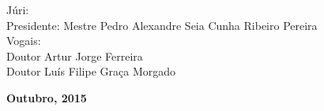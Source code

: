 \begin{titlepage}
\begin{center}
		\begin{tabbing}
		   \fontsize{12pt}{10pt}\selectfont
		   Júri: \\
		   \fontsize{11pt}{10pt}\selectfont
		   \hspace{1.1cm}Presidente: Mestre Pedro Alexandre Seia Cunha Ribeiro Pereira \\
		   \fontsize{11pt}{10pt}\selectfont
		   \hspace{1.1cm}Vogais: \\
		   \fontsize{11pt}{10pt}\selectfont
		   \hspace{2.2cm}Doutor Artur Jorge Ferreira \\
		   \fontsize{11pt}{10pt}\selectfont
		   \hspace{2.2cm}Doutor Luís Filipe Graça Morgado\\
		\end{tabbing}
		
		\fontsize{10pt}{10pt}\selectfont
		\textbf{Outubro, 2015}
	\end{center}


	
\end{titlepage}
